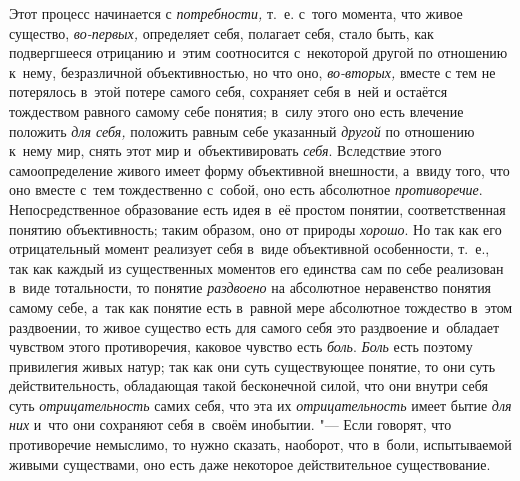 Этот процесс начинается с
{\em потребности,} т.~е.
с~того момента, что живое существо,
{\em во-первых,}
определяет себя, полагает себя, стало быть, как подвергшееся
отрицанию и~этим соотносится с~некоторой другой по отношению к~нему,
безразличной объективностью, но что оно,
{\em во-вторых,} вместе с
тем не потерялось в~этой потере самого себя, сохраняет себя в~ней и
остаётся тождеством равного самому себе понятия; в~силу этого оно есть
влечение положить {\em для себя,}
положить равным себе указанный
{\em другой} по отношению
к~нему мир, снять этот мир и~объективировать
{\em себя}. Вследствие
этого самоопределение живого имеет форму объективной внешности, а~ввиду
того, что оно вместе с~тем тождественно с~собой, оно есть абсолютное
{\em противоречие}.
Непосредственное образование есть идея в~её простом понятии,
соответственная понятию объективность; таким образом, оно от природы
{\em хорошо}. Но так как
его отрицательный момент реализует себя в~виде объективной особенности,
т.~е., так как каждый из существенных моментов его единства сам по себе
реализован в~виде тотальности, то понятие
{\em раздвоено} на
абсолютное неравенство понятия самому себе, а~так как понятие есть в~равной
мере абсолютное тождество в~этом раздвоении, то живое существо есть для
самого себя это раздвоение и~обладает чувством этого противоречия, каковое
чувство есть {\em боль}.
{\em Боль} есть поэтому
привилегия живых натур; так как они суть существующее понятие, то они суть
действительность, обладающая такой бесконечной силой, что они внутри себя
суть {\em отрицательность}
самих себя, что эта их
{\em отрицательность}
имеет бытие {\em для них}
и~что они сохраняют себя в~своём инобытии. "---
Если говорят, что противоречие немыслимо, то нужно сказать,
наоборот, что в~боли, испытываемой живыми существами, оно есть даже
некоторое действительное существование.

